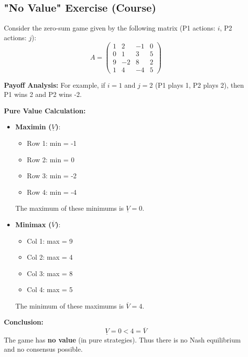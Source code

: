 \subsection{"No Value" Exercise (Course)}
Consider the zero-sum game given by the following matrix (P1 actions: $i$, P2 actions: $j$):
$$ A = \begin{pmatrix} 1 & 2 & -1 & 0 \\ 0 & 1 & 3 & 5 \\ 9 & -2 & 8 & 2 \\ 1 & 4 & -4 & 5 \end{pmatrix} $$

\textbf{Payoff Analysis:}
For example, if $i=1$ and $j=2$ (P1 plays 1, P2 plays 2), then P1 wins 2 and P2 wins -2.

\textbf{Pure Value Calculation:}
\begin{itemize}
    \item \textbf{Maximin ($\underline{V}$)}:
    \begin{itemize}
        \item Row 1: min = -1
        \item Row 2: min = 0
        \item Row 3: min = -2
        \item Row 4: min = -4
    \end{itemize}
    The maximum of these minimums is $\underline{V} = 0$.

    \item \textbf{Minimax ($\overline{V}$)}:
    \begin{itemize}
        \item Col 1: max = 9
        \item Col 2: max = 4
        \item Col 3: max = 8
        \item Col 4: max = 5
    \end{itemize}
    The minimum of these maximums is $\overline{V} = 4$.
\end{itemize}

\textbf{Conclusion:}
$$ \underline{V} = 0 < 4 = \overline{V} $$
The game has \textbf{no value} (in pure strategies). Thus there is no Nash equilibrium and no consensus possible.

